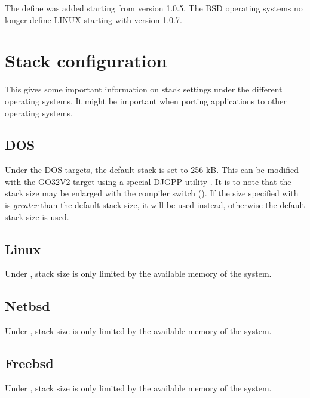 \begin{remark}
The \unix define was added starting from \fpc version 1.0.5. The BSD
operating systems no longer define LINUX starting with version 1.0.7.
\end{remark}


\chapter{Stack configuration}
\label{ch:AppH}

This gives some important information on stack settings under
the different operating systems. It might be important when
porting applications to other operating systems.

\section{DOS}

Under the DOS targets, the default stack is set to 256 kB.
This can be modified with the GO32V2 target using a special
DJGPP utility . It is to note that the stack
size may be enlarged with the compiler switch ().
If the size specified with  is \emph{greater} 
than the default stack size, it will be used instead, 
otherwise the default stack size is used.

\section{Linux}

Under \linux, stack size is only limited by the available memory of
the system.

\section{Netbsd}

Under \netbsd, stack size is only limited by the available memory of
the system.

\section{Freebsd}

Under \freebsd, stack size is only limited by the available memory of
the system.


